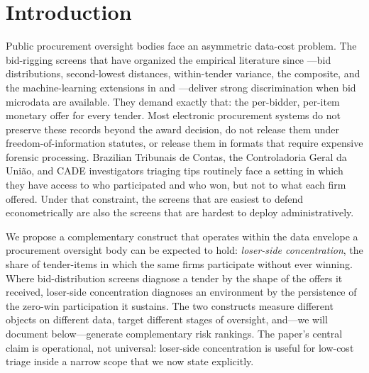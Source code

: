 
\section{Introduction}
\label{sec:intro}

Public procurement oversight bodies face an asymmetric
data-cost problem. The bid-rigging screens that have organized
the empirical literature since
\citet{porter1993detection}---bid distributions, second-lowest
distances, within-tender variance, the
\citet{imhof2019detecting} composite, and the machine-learning
extensions in \citet{huber2019machine} and
\citet{wallimann2023machine}---deliver strong discrimination
when bid microdata are available. They demand exactly that:
the per-bidder, per-item monetary offer for every tender. Most
electronic procurement systems do not preserve these records
beyond the award decision, do not release them under freedom-of-information
statutes, or release them in formats that
require expensive forensic processing. Brazilian Tribunais de
Contas, the Controladoria Geral da União, and CADE
investigators triaging tips routinely face a setting in which
they have access to who participated and who won, but not
to what each firm offered. Under that constraint, the screens
that are easiest to defend econometrically are also the screens
that are hardest to deploy administratively.

We propose a complementary construct that operates within the
data envelope a procurement oversight body can be expected to
hold: \emph{loser-side concentration}, the share of
tender-items in which the same firms participate without ever
winning. Where bid-distribution screens diagnose a tender by
the shape of the offers it received, loser-side concentration
diagnoses an environment by the persistence of the
zero-win participation it sustains. The two constructs measure
different objects on different data, target different stages of
oversight, and---we will document below---generate
complementary risk rankings. The paper's central claim is
operational, not universal: loser-side concentration is useful
for low-cost triage inside a narrow scope that we now state
explicitly.

